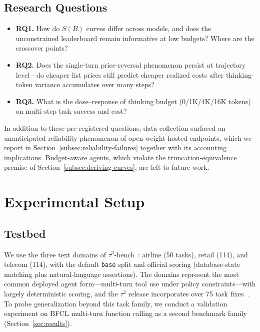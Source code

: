 \documentclass[preprint,authoryear,12pt]{elsarticle}
\begin{document}
\subsection{Research Questions}
\label{subsec:research-questions}
\begin{itemize}
\item \textbf{RQ1.} How do $S(B)$ curves differ across models, and does the unconstrained leaderboard remain informative at low budgets? Where are the crossover points?
\item \textbf{RQ2.} Does the single-turn price-reversal phenomenon persist at trajectory level---do cheaper list prices still predict cheaper realized costs after thinking-token variance accumulates over many steps?
\item \textbf{RQ3.} What is the dose--response of thinking budget (0/1K/4K/16K tokens) on multi-step task success and cost?
\end{itemize}
In addition to these pre-registered questions, data collection surfaced an unanticipated reliability phenomenon of open-weight hosted endpoints, which we report in Section~\ref{subsec:reliability-failures} together with its accounting implications. Budget-aware agents, which violate the truncation-equivalence premise of Section~\ref{subsec:deriving-curves}, are left to future work.

\section{Experimental Setup}
\label{sec:experimental-setup}

\subsection{Testbed}
\label{subsec:testbed}
We use the three text domains of $\tau^3$-bench~\cite{barres2025tau2bench}: airline (50 tasks), retail (114), and telecom (114), with the default \texttt{base} split and official scoring (database-state matching plus natural-language assertions). The domains represent the most common deployed agent form---multi-turn tool use under policy constraints---with largely deterministic scoring, and the $\tau^3$ release incorporates over 75 task fixes~\cite{cuadron2025saber}. To probe generalization beyond this task family, we conduct a validation experiment on BFCL multi-turn function calling as a second benchmark family (Section~\ref{sec:results}).
\end{document}
